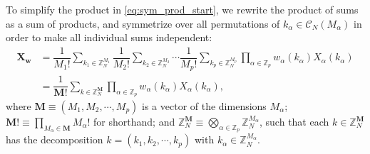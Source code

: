 \documentclass[nofootinbib,notitlepage,11pt]{revtex4-2}
\newcommand{\f}[2]{\dfrac{#1}{#2}} %
\newcommand{\p}[1]{\left(#1\right)} %
\newcommand{\m}{\bm} %
\newcommand{\1}{\mathds{1}}
\newcommand{\C}{\mathcal{C}}
\newcommand{\ZZ}{\mathbb{Z}}
\begin{document}
To simplify the product in \eqref{eq:sym_prod_start}, we rewrite the
product of sums as a sum of products, and symmetrize over all
permutations of $k_\alpha\in\C_N\p{M_\alpha}$ in order to make all
individual sums independent:
\begin{align}
  \m X_{\m w}
  &= \f1{M_1!} \sum_{k_1\in\ZZ_N^{M_1}}
  \f1{M_2!} \sum_{k_2\in\ZZ_N^{M_2}} \cdots
  \f1{M_p!} \sum_{k_p\in\ZZ_N^{M_p}}
  \prod_{\alpha\in\ZZ_p} w_\alpha\p{k_\alpha} X_\alpha\p{k_\alpha} \\
  &= \f1{\m M!} \sum_{k\in\ZZ_N^{\m M}} \prod_{\alpha\in\ZZ_p}
  w_\alpha\p{k_\alpha} X_\alpha\p{k_\alpha},
  \label{eq:sum_of_products}
\end{align}
where $\m M\equiv\p{M_1,M_2,\cdots,M_p}$ is a vector of the
dimensions $M_\alpha$; $\m M!\equiv\prod_{M_\alpha\in\m M}M_\alpha!$
for shorthand; and
$\ZZ_N^{\m M}\equiv\bigotimes_{\alpha\in\ZZ_p}\ZZ_N^{M_\alpha}$, such
that each $k\in\ZZ_N^{\m M}$ has the decomposition
$k=\p{k_1,k_2,\cdots,k_p}$ with $k_\alpha\in\ZZ_N^{M_\alpha}$.
\end{document}
